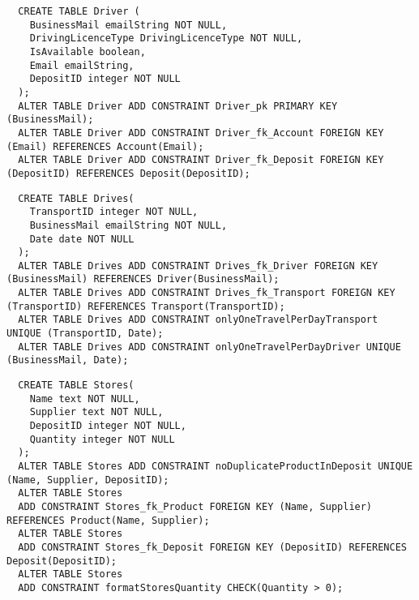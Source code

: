 \begin{lstlisting}
  CREATE TABLE Driver (
    BusinessMail emailString NOT NULL,
    DrivingLicenceType DrivingLicenceType NOT NULL,
    IsAvailable boolean,
    Email emailString, 
    DepositID integer NOT NULL 
  );
  ALTER TABLE Driver ADD CONSTRAINT Driver_pk PRIMARY KEY (BusinessMail);
  ALTER TABLE Driver ADD CONSTRAINT Driver_fk_Account FOREIGN KEY (Email) REFERENCES Account(Email);
  ALTER TABLE Driver ADD CONSTRAINT Driver_fk_Deposit FOREIGN KEY (DepositID) REFERENCES Deposit(DepositID);
\end{lstlisting}

\begin{lstlisting}
  CREATE TABLE Drives(
    TransportID integer NOT NULL,
    BusinessMail emailString NOT NULL,
    Date date NOT NULL
  );
  ALTER TABLE Drives ADD CONSTRAINT Drives_fk_Driver FOREIGN KEY (BusinessMail) REFERENCES Driver(BusinessMail);
  ALTER TABLE Drives ADD CONSTRAINT Drives_fk_Transport FOREIGN KEY (TransportID) REFERENCES Transport(TransportID);
  ALTER TABLE Drives ADD CONSTRAINT onlyOneTravelPerDayTransport UNIQUE (TransportID, Date);
  ALTER TABLE Drives ADD CONSTRAINT onlyOneTravelPerDayDriver UNIQUE (BusinessMail, Date);
\end{lstlisting}

\begin{lstlisting}
  CREATE TABLE Stores(
    Name text NOT NULL,
    Supplier text NOT NULL,
    DepositID integer NOT NULL,
    Quantity integer NOT NULL
  );
  ALTER TABLE Stores ADD CONSTRAINT noDuplicateProductInDeposit UNIQUE (Name, Supplier, DepositID);
  ALTER TABLE Stores
  ADD CONSTRAINT Stores_fk_Product FOREIGN KEY (Name, Supplier) REFERENCES Product(Name, Supplier);
  ALTER TABLE Stores
  ADD CONSTRAINT Stores_fk_Deposit FOREIGN KEY (DepositID) REFERENCES Deposit(DepositID);
  ALTER TABLE Stores
  ADD CONSTRAINT formatStoresQuantity CHECK(Quantity > 0);
\end{lstlisting}
